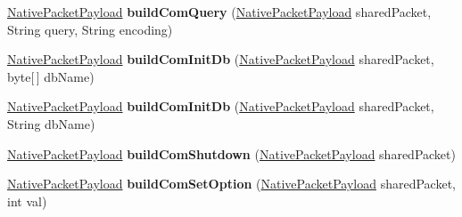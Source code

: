 \begin{DoxyCompactItemize}
\mbox{\hyperlink{classcom_1_1mysql_1_1cj_1_1protocol_1_1a_1_1_native_packet_payload}{Native\+Packet\+Payload}} {\bfseries build\+Com\+Query} (\mbox{\hyperlink{classcom_1_1mysql_1_1cj_1_1protocol_1_1a_1_1_native_packet_payload}{Native\+Packet\+Payload}} shared\+Packet, String query, String encoding)
\item 
\mbox{\label{classcom_1_1mysql_1_1cj_1_1protocol_1_1a_1_1_native_message_builder_aa06ab51c766e8a90f768a27b272c05f0}} 
\mbox{\hyperlink{classcom_1_1mysql_1_1cj_1_1protocol_1_1a_1_1_native_packet_payload}{Native\+Packet\+Payload}} {\bfseries build\+Com\+Init\+Db} (\mbox{\hyperlink{classcom_1_1mysql_1_1cj_1_1protocol_1_1a_1_1_native_packet_payload}{Native\+Packet\+Payload}} shared\+Packet, byte\mbox{[}$\,$\mbox{]} db\+Name)
\item 
\mbox{\label{classcom_1_1mysql_1_1cj_1_1protocol_1_1a_1_1_native_message_builder_af7d5c3db7a4e2be1ca5818cdbb096197}} 
\mbox{\hyperlink{classcom_1_1mysql_1_1cj_1_1protocol_1_1a_1_1_native_packet_payload}{Native\+Packet\+Payload}} {\bfseries build\+Com\+Init\+Db} (\mbox{\hyperlink{classcom_1_1mysql_1_1cj_1_1protocol_1_1a_1_1_native_packet_payload}{Native\+Packet\+Payload}} shared\+Packet, String db\+Name)
\item 
\mbox{\label{classcom_1_1mysql_1_1cj_1_1protocol_1_1a_1_1_native_message_builder_af75a2d2a26bf9bfe25be05405ce19e50}} 
\mbox{\hyperlink{classcom_1_1mysql_1_1cj_1_1protocol_1_1a_1_1_native_packet_payload}{Native\+Packet\+Payload}} {\bfseries build\+Com\+Shutdown} (\mbox{\hyperlink{classcom_1_1mysql_1_1cj_1_1protocol_1_1a_1_1_native_packet_payload}{Native\+Packet\+Payload}} shared\+Packet)
\item 
\mbox{\label{classcom_1_1mysql_1_1cj_1_1protocol_1_1a_1_1_native_message_builder_aca9d3bf6bdfa9d634a9e937c5c354a4c}} 
\mbox{\hyperlink{classcom_1_1mysql_1_1cj_1_1protocol_1_1a_1_1_native_packet_payload}{Native\+Packet\+Payload}} {\bfseries build\+Com\+Set\+Option} (\mbox{\hyperlink{classcom_1_1mysql_1_1cj_1_1protocol_1_1a_1_1_native_packet_payload}{Native\+Packet\+Payload}} shared\+Packet, int val)
\item 

\end{DoxyCompactItemize}
